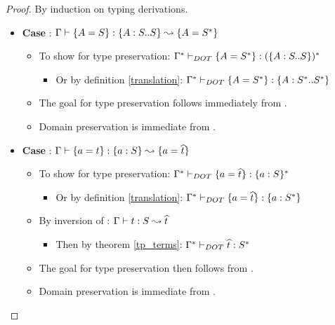 \begin{proof}
    By induction on typing derivations.
    \begin{itemize}
        \item \textbf{Case} :
            $\Gamma \vdash \{A = S\}: \{A : S .. S\} \leadsto \{A = S^{*}\}$
        \begin{itemize}
            \item To show for type preservation: $\Gamma^{*} \vdash_{DOT} \{A = S^{*}\}: (\{A : S .. S\})^{*}$
            \begin{itemize}
                \item Or by definition \ref{translation}: $\Gamma^{*} \vdash_{DOT} \{A = S^{*}\}: \{A : S^{*} .. S^{*}\}$
            \end{itemize}
            \item The goal for type preservation follows immediately from
                .
            \item Domain preservation is immediate from .
        \end{itemize}
        \item \textbf{Case} :
            $\Gamma \vdash \{a = t\}: \{a : S\} \leadsto \{a = \widehat{t}\}$
        \begin{itemize}
            \item To show for type preservation:
                $\Gamma^{*} \vdash_{DOT} \{a = \widehat{t}\}: \{a : S\}^{*}$
            \begin{itemize}
                \item Or by definition \ref{translation}: $\Gamma^{*} \vdash_{DOT} \{a = \widehat{t}\}: \{a : S^{*}\}$
            \end{itemize}
            \item By inversion of : $\Gamma \vdash t: S \leadsto \widehat{t}$
            \begin{itemize}
                \item Then by theorem \ref{tp_terms}:
                    $\Gamma^{*} \vdash_{DOT} \widehat{t}: S^{*}$
            \end{itemize}
            \item The goal for type preservation then follows from
                .
            \item Domain preservation is immediate from .
        \end{itemize}

\end{itemize}
\end{proof}
